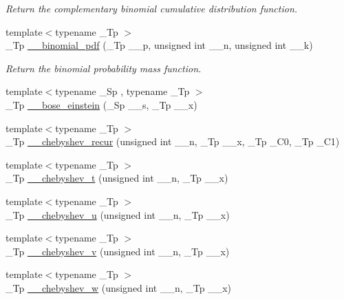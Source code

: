 \begin{DoxyCompactItemize}
\begin{DoxyCompactList}\small\item\em Return the complementary binomial cumulative distribution function. \end{DoxyCompactList}\item 
{\footnotesize template$<$typename \+\_\+\+Tp $>$ }\\\+\_\+\+Tp \hyperlink{namespacestd_1_1____detail_acaeb596397431731cba684ca1f04cbfc}{\+\_\+\+\_\+binomial\+\_\+pdf} (\+\_\+\+Tp \+\_\+\+\_\+p, unsigned int \+\_\+\+\_\+n, unsigned int \+\_\+\+\_\+k)
\begin{DoxyCompactList}\small\item\em Return the binomial probability mass function. \end{DoxyCompactList}\item 
{\footnotesize template$<$typename \+\_\+\+Sp , typename \+\_\+\+Tp $>$ }\\\+\_\+\+Tp \hyperlink{namespacestd_1_1____detail_a75feb55399bc2c9c2ccff19877c8af2b}{\+\_\+\+\_\+bose\+\_\+einstein} (\+\_\+\+Sp \+\_\+\+\_\+s, \+\_\+\+Tp \+\_\+\+\_\+x)
\item 
{\footnotesize template$<$typename \+\_\+\+Tp $>$ }\\\+\_\+\+Tp \hyperlink{namespacestd_1_1____detail_a3a893b4c60f3245af5db4ca792c4b2cf}{\+\_\+\+\_\+chebyshev\+\_\+recur} (unsigned int \+\_\+\+\_\+n, \+\_\+\+Tp \+\_\+\+\_\+x, \+\_\+\+Tp \+\_\+\+C0, \+\_\+\+Tp \+\_\+\+C1)
\item 
{\footnotesize template$<$typename \+\_\+\+Tp $>$ }\\\+\_\+\+Tp \hyperlink{namespacestd_1_1____detail_af4ba1015e914cdd23d9e5d2be69740c1}{\+\_\+\+\_\+chebyshev\+\_\+t} (unsigned int \+\_\+\+\_\+n, \+\_\+\+Tp \+\_\+\+\_\+x)
\item 
{\footnotesize template$<$typename \+\_\+\+Tp $>$ }\\\+\_\+\+Tp \hyperlink{namespacestd_1_1____detail_aa3289db0a53f55007bc10dc94f15c1f7}{\+\_\+\+\_\+chebyshev\+\_\+u} (unsigned int \+\_\+\+\_\+n, \+\_\+\+Tp \+\_\+\+\_\+x)
\item 
{\footnotesize template$<$typename \+\_\+\+Tp $>$ }\\\+\_\+\+Tp \hyperlink{namespacestd_1_1____detail_a684b312a311bbe2065a2633220f4507d}{\+\_\+\+\_\+chebyshev\+\_\+v} (unsigned int \+\_\+\+\_\+n, \+\_\+\+Tp \+\_\+\+\_\+x)
\item 
{\footnotesize template$<$typename \+\_\+\+Tp $>$ }\\\+\_\+\+Tp \hyperlink{namespacestd_1_1____detail_ae220390e755bdc4908e040fd68426d14}{\+\_\+\+\_\+chebyshev\+\_\+w} (unsigned int \+\_\+\+\_\+n, \+\_\+\+Tp \+\_\+\+\_\+x)

\end{DoxyCompactItemize}
